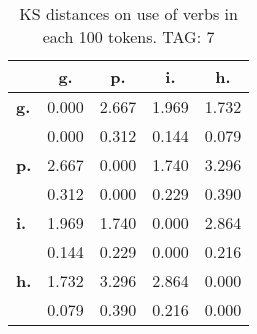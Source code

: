 \begin{table}[h!]
\begin{center}
\begin{tabular}{| l || c | c | c | c |}\hline
 & {\bf g.} & {\bf p.} & {\bf i.} & {\bf h.} \\\hline\hline
{\bf g.} & 0.000 & 2.667 & 1.969 & 1.732 \\
{\bf } & 0.000 & 0.312 & 0.144 & 0.079 \\\hline
{\bf p.} & 2.667 & 0.000 & 1.740 & 3.296 \\
{\bf } & 0.312 & 0.000 & 0.229 & 0.390 \\\hline
{\bf i.} & 1.969 & 1.740 & 0.000 & 2.864 \\
{\bf } & 0.144 & 0.229 & 0.000 & 0.216 \\\hline
{\bf h.} & 1.732 & 3.296 & 2.864 & 0.000 \\
{\bf } & 0.079 & 0.390 & 0.216 & 0.000 \\\hline
\end{tabular}
\caption{KS distances on use of verbs in each 100 tokens. TAG: 7}
\end{center}
\end{table}